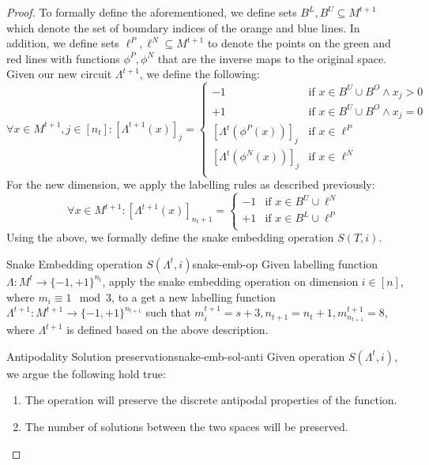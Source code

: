 \begin{proof}
        To formally define the aforementioned, we define sets $B^L,B^U \subseteq M^{t+1}$
        which denote the set of boundary indices of the orange and blue lines.
        In addition, we define sets $\ell^P, \ell^N \subseteq M^{t+1}$ to denote the points on the green and red lines
        with functions $\phi^P, \phi^N$  that are the inverse maps to the original space.
        Given our new circuit $\Lambda^{t+1}$, we define the following:
        $$
            \forall x \in M^{t+1}, j\in [n_t]:  [\Lambda^{t+1}(x)]_j = \begin{cases}
                -1                         & \text{if  }  x \in B^U \cup B^O \wedge x_j > 0 \\
                +1                         & \text{if  }  x \in B^U \cup B^O \wedge x_j = 0 \\
                [\Lambda^{t}(\phi^P(x))]_j & \text{if } x \in \ell^P                        \\
                [\Lambda^{t}(\phi^N(x))]_j & \text{if } x \in \ell^N                        \\
            \end{cases}
        $$
        For the new dimension, we apply the labelling rules as described previously:
        $$
            \forall x \in M^{t+1}:  [\Lambda^{t+1}(x)]_{n_t+1} = \begin{cases}
                -1 & \text{if  }  x \in B^U \cup \ell^N \\
                +1 & \text{if  }  x \in B^L \cup \ell^P \\
            \end{cases}
        $$
        Using the above, we formally define the snake embedding operation $S(T, i)$.

        \begin{definitionbox}{Snake Embedding operation $S(\Lambda^t, i)$}{snake-emb-op}
            Given labelling function $\Lambda: M^t \to \{-1, +1\}^{n_t}$, apply the snake embedding operation
            on dimension $i \in [n]$, where $m_i \equiv 1 \mod 3$, to a get a new labelling function
            $\Lambda^{t+1}: M^{t+1} \to \{-1, +1\}^{n_{t+1}}$ such that
            $m_i^{t+1} = s + 3, n_{t+1} = n_t +1, m_{n_{t+1}}^{t+1} = 8$, where $\Lambda^{t+1}$ is defined
            based on the above description.
        \end{definitionbox}

        \begin{claimbox}{Antipodality Solution preservation}{snake-emb-sol-anti}
            Given operation $S(\Lambda^t, i)$, we argue the following hold true:
            \begin{enumerate}
                \item The operation will preserve the discrete antipodal properties of the function.
                \item The number of solutions between the two spaces will be preserved.
            \end{enumerate}
        \end{claimbox}


\end{proof}
